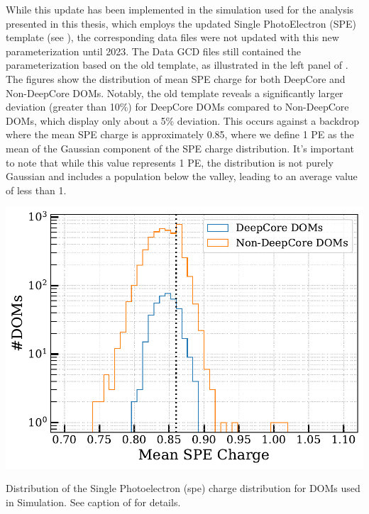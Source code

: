 While this update has been implemented in the simulation used for the analysis presented in this thesis, which employs the updated Single PhotoElectron (SPE) template (see ), the corresponding data files were not updated with this new parameterization until 2023. The Data GCD files still contained the parameterization based on the old template, as illustrated in the left panel of . The figures show the distribution of mean SPE charge for both DeepCore and Non-DeepCore DOMs. Notably, the old template reveals a significantly larger deviation (greater than 10\%) for DeepCore DOMs compared to Non-DeepCore DOMs, which display only about a 5\% deviation. This occurs against a backdrop where the mean SPE charge is approximately 0.85, where we define 1 PE as the mean of the Gaussian component of the SPE charge distribution. It’s important to note that while this value represents 1 PE, the distribution is not purely Gaussian and includes a population below the valley, leading to an average value of less than 1.
\begin{marginfigure}
    
    \includegraphics{./figures/results/Updated.pdf}


    \caption[Distribution of the Single Photoelectron (spe) charge for DOMs in simulation]{Distribution of the Single Photoelectron (spe) charge distribution for DOMs used in Simulation. See caption of  for details.}
\end{marginfigure}
